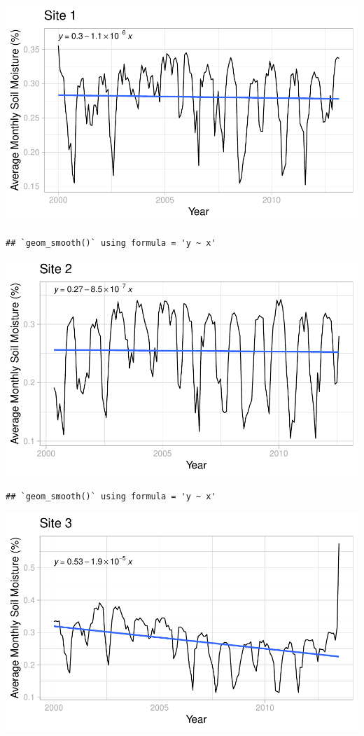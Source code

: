 \documentclass[
  12pt,
]{article}
\begin{document}
\includegraphics{Project_Template_files/figure-latex/Average Monthly Soil Moisture Plots-1.pdf}

\begin{verbatim}
## `geom_smooth()` using formula = 'y ~ x'
\end{verbatim}

\includegraphics{Project_Template_files/figure-latex/Average Monthly Soil Moisture Plots-2.pdf}

\begin{verbatim}
## `geom_smooth()` using formula = 'y ~ x'
\end{verbatim}

\includegraphics{Project_Template_files/figure-latex/Average Monthly Soil Moisture Plots-3.pdf}
\end{document}
